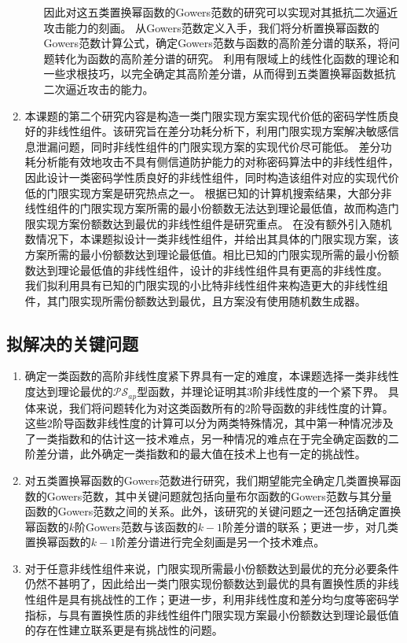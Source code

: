 \documentclass[a4paper,zihao=-4,AutoFakeBold]{ctexart}
\begin{document}
\begin{enumerate}[label=(\arabic{*})]
\begin{enumerate}
        因此对这五类置换幂函数的Gowers范数的研究可以实现对其抵抗二次逼近攻击能力的刻画。
        从Gowers范数定义入手，我们将分析置换幂函数的Gowers范数计算公式，确定Gowers范数与函数的高阶差分谱的联系，将问题转化为函数的高阶差分谱的研究。
        利用有限域上的线性化函数的理论和一些求根技巧，以完全确定其高阶差分谱，从而得到五类置换幂函数抵抗二次逼近攻击的能力。
    \end{enumerate}
    \item 本课题的第二个研究内容是构造一类门限实现方案实现代价低的密码学性质良好的非线性组件。该研究旨在差分功耗分析下，利用门限实现方案解决敏感信息泄漏问题，同时非线性组件的门限实现方案的实现代价尽可能低。
    差分功耗分析能有效地攻击不具有侧信道防护能力的对称密码算法中的非线性组件，因此设计一类密码学性质良好的非线性组件，同时构造该组件对应的实现代价低的门限实现方案是研究热点之一。 
    根据已知的计算机搜索结果，大部分非线性组件的门限实现方案所需的最小份额数无法达到理论最低值，故而构造门限实现方案份额数达到最优的非线性组件是研究重点。
    在没有额外引入随机数情况下，本课题拟设计一类非线性组件，并给出其具体的门限实现方案，该方案所需的最小份额数达到理论最低值。相比已知的门限实现所需的最小份额数达到理论最低值的非线性组件，设计的非线性组件具有更高的非线性度。
    我们拟利用具有已知的门限实现的小比特非线性组件来构造更大的非线性组件，其门限实现所需份额数达到最优，且方案没有使用随机数生成器。
\end{enumerate}
\subsection{拟解决的关键问题}
\begin{enumerate}[label=(\arabic{*})]
    \item 确定一类函数的高阶非线性度紧下界具有一定的难度，本课题选择一类非线性度达到理论最优的$\mathcal{PS}_{ap}$型函数，并理论证明其$3$阶非线性度的一个紧下界。
    具体来说，我们将问题转化为对这类函数所有的$2$阶导函数的非线性度的计算。这些$2$阶导函数非线性度的计算可以分为两类特殊情况，其中第一种情况涉及了一类指数和的估计这一技术难点，另一种情况的难点在于完全确定函数的二阶差分谱，此外确定一类指数和的最大值在技术上也有一定的挑战性。
    \item 对五类置换幂函数的Gowers范数进行研究，我们期望能完全确定几类置换幂函数的Gowers范数，其中关键问题就包括向量布尔函数的Gowers范数与其分量函数的Gowers范数之间的关系。此外，该研究的关键问题之一还包括确定置换幂函数的$k$阶Gowers范数与该函数的$k-1$阶差分谱的联系；更进一步，对几类置换幂函数的$k-1$阶差分谱进行完全刻画是另一个技术难点。
    \item 对于任意非线性组件来说，门限实现所需最小份额数达到最优的充分必要条件仍然不甚明了，因此给出一类门限实现份额数达到最优的具有置换性质的非线性组件是具有挑战性的工作；更进一步，利用非线性度和差分均匀度等密码学指标，与具有置换性质的非线性组件门限实现方案最小份额数达到理论最低值的存在性建立联系更是有挑战性的问题。
\end{enumerate}
\end{document}
